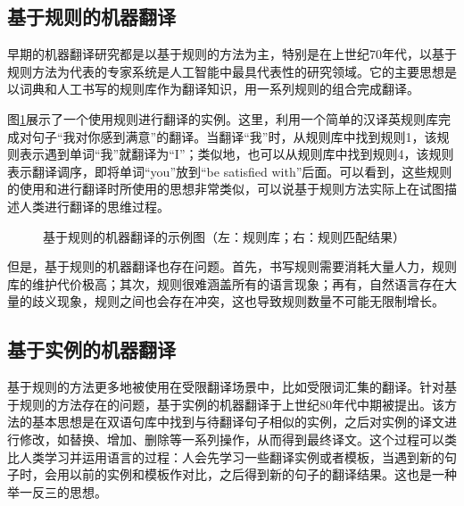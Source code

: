 
\subsection{基于规则的机器翻译}

\parinterval 早期的机器翻译研究都是以基于规则的方法为主，特别是在上世纪70年代，以基于规则方法为代表的专家系统是人工智能中最具代表性的研究领域。它的主要思想是以词典和人工书写的规则库作为翻译知识，用一系列规则的组合完成翻译。

\parinterval 图\ref{fig:1-8}展示了一个使用规则进行翻译的实例。这里，利用一个简单的汉译英规则库完成对句子``我对你感到满意''的翻译。当翻译``我''时，从规则库中找到规则1，该规则表示遇到单词``我''就翻译为``I''；类似地，也可以从规则库中找到规则4，该规则表示翻译调序，即将单词``you''放到``be satisfied with''后面。可以看到，这些规则的使用和进行翻译时所使用的思想非常类似，可以说基于规则方法实际上在试图描述人类进行翻译的思维过程。

\begin{figure}[htp]
    \centering

\setlength{\belowcaptionskip}{-1.5em}
    \caption{基于规则的机器翻译的示例图（左：规则库；右：规则匹配结果）}
    \label{fig:1-8}
\end{figure}

\parinterval 但是，基于规则的机器翻译也存在问题。首先，书写规则需要消耗大量人力，规则库的维护代价极高；其次，规则很难涵盖所有的语言现象；再有，自然语言存在大量的歧义现象，规则之间也会存在冲突，这也导致规则数量不可能无限制增长。


\subsection{基于实例的机器翻译}

\parinterval 基于规则的方法更多地被使用在受限翻译场景中，比如受限词汇集的翻译。针对基于规则的方法存在的问题，基于实例的机器翻译于上世纪80年代中期被提出\cite{nagao1984framework}。该方法的基本思想是在双语句库中找到与待翻译句子相似的实例，之后对实例的译文进行修改，如替换、增加、删除等一系列操作，从而得到最终译文。这个过程可以类比人类学习并运用语言的过程：人会先学习一些翻译实例或者模板，当遇到新的句子时，会用以前的实例和模板作对比，之后得到新的句子的翻译结果。这也是一种举一反三的思想。

